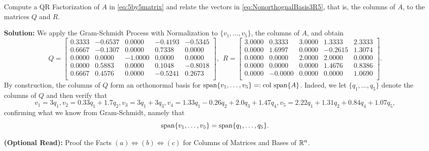 \Qed

\begin{example}
\label{ex:BasisR5_partb} 
Compute a QR Factorization of $A$ in \eqref{eq:5by5matrix} and relate the vectors in \eqref{eq:NonorthognalBasis3R5}, that is, the columns of $A$, to the matrices $Q$ and $R$.
 \end{example}

\textbf{Solution:} We apply the Gram-Schmidt Process with Normalization to $\{v_1, \ldots, v_5\}$, the columns of $A$, and obtain
$$
Q=\left[
\begin{array}{rrrrr}
0.3333 & -0.6537 & 0.0000 & -0.4193 & -0.5345 \\
0.6667 & -0.1307 & 0.0000 & 0.7338 & 0.0000 \\
0.0000 & 0.0000 & -1.0000 & 0.0000 & 0.0000 \\
0.0000 & 0.5883 & 0.0000 & 0.1048 & -0.8018 \\
0.6667 & 0.4576 & 0.0000 & -0.5241 & 0.2673 \\
\end{array}
\right],~~R=\left[
\begin{array}{rrrrr}
3.0000 & 0.3333 & 3.0000 & 1.3333 & 2.3333 \\
0.0000 & 1.6997 & 0.0000 & -0.2615 & 1.3074 \\
0.0000 & 0.0000 & 2.0000 & 2.0000 & 0.0000 \\
0.0000 & 0.0000 & 0.0000 & 1.4676 & 0.8386 \\
0.0000 & -0.0000 & 0.0000 & 0.0000 & 1.0690 \\
\end{array}
\right].
$$
By construction, the columns of $Q$ form an orthonormal basis for $\mathrm{span} \{ v_1, \ldots, v_5 \}=:\mathrm{col~span} \{ A \}$. Indeed, we let  $\{q_1, \ldots, q_5\}$ denote the columns of $Q$ and then verify that
$$v_1 = 3 q_1, v_2 = 0.33 q_1 + 1.7 q_2, v_3 = 3 q_1 + 3 q_3, v_4 =  1.33 q_1 - 0.26 q_2 + 2.0 q_3 + 1.47 q_4, v_5 = 2.22 q_1 + 1.31 q_2 + 0.84 q_4 + 1.07 q_5,$$
confirming what we know from Gram-Schmidt, namely that
$$\mathrm{span} \{ v_1, \ldots, v_5 \} = \mathrm{span} \{ q_1, \ldots, q_5 \}. $$

\Qed

\vspace*{.2cm}

\textbf{(Optional Read):} Proof the Facts $(a) \iff (b) \iff (c)$  for Columns of Matrices and Bases of $\mathbb R^n$.\\

